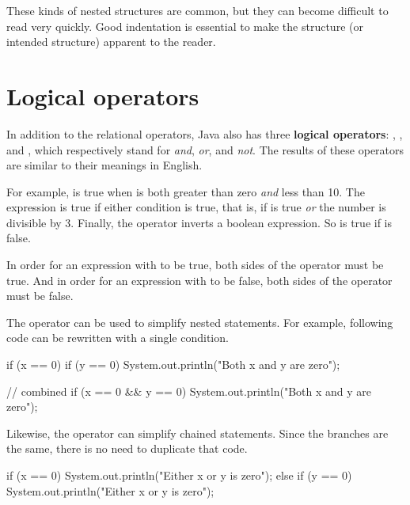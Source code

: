 These kinds of nested structures are common, but they can become difficult to read very quickly.
Good indentation is essential to make the structure (or intended structure) apparent to the reader.


\section{Logical operators}


In addition to the relational operators, Java also has three {\bf logical operators}: \java{&&}, \java{||}, and \java{!}, which respectively stand for {\em and}, {\em or}, and {\em not}.
The results of these operators are similar to their meanings in English.

For example,  is true when  is both greater than zero {\em and} less than 10.
The expression  is true if either condition is true, that is, if  is true {\em or} the number  is divisible by 3.
Finally, the \java{!} operator inverts a boolean expression.
So  is true if  is false.

In order for an expression with \java{&&} to be true, both sides of the \java{&&} operator  must be true.
And in order for an expression with \java{||} to be false, both sides of the \java{||} operator must be false.

The \java{&&} operator can be used to simplify nested  statements.
For example, following code can be rewritten with a single condition.

\begin{code}
if (x == 0) {
    if (y == 0) {
        System.out.println("Both x and y are zero");
    }
}
\end{code}

\begin{code}
// combined
if (x == 0 && y == 0) {
    System.out.println("Both x and y are zero");
}
\end{code}

Likewise, the \java{||} operator can simplify chained  statements.
Since the branches are the same, there is no need to duplicate that code.

\begin{code}
if (x == 0) {
    System.out.println("Either x or y is zero");
} else if (y == 0) {
    System.out.println("Either x or y is zero");
}
\end{code}

